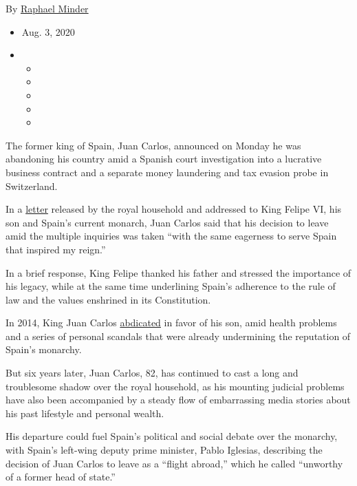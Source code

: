 By \href{https://www.nytimes3xbfgragh.onion/by/raphael-minder}{Raphael
Minder}

\begin{itemize}
\item
  Aug. 3, 2020
\item
  \begin{itemize}
  \item
  \item
  \item
  \item
  \item
  \end{itemize}
\end{itemize}

The former king of Spain, Juan Carlos, announced on Monday he was
abandoning his country amid a Spanish court investigation into a
lucrative business contract and a separate money laundering and tax
evasion probe in Switzerland.

In a
\href{https://www.casareal.es/EN/AreaPrensa/Paginas/area_prensa_comunicados_interior.aspx?data=113}{letter}
released by the royal household and addressed to King Felipe VI, his son
and Spain's current monarch, Juan Carlos said that his decision to leave
amid the multiple inquiries was taken ``with the same eagerness to serve
Spain that inspired my reign.''

In a brief response, King Felipe thanked his father and stressed the
importance of his legacy, while at the same time underlining Spain's
adherence to the rule of law and the values enshrined in its
Constitution.

In 2014, King Juan Carlos
\href{https://www.nytimes3xbfgragh.onion/2014/06/12/world/europe/spanish-lawmakers-clear-way-for-kings-abdication.html}{abdicated}
in favor of his son, amid health problems and a series of personal
scandals that were already undermining the reputation of Spain's
monarchy.

But six years later, Juan Carlos, 82, has continued to cast a long and
troublesome shadow over the royal household, as his mounting judicial
problems have also been accompanied by a steady flow of embarrassing
media stories about his past lifestyle and personal wealth.

His departure could fuel Spain's political and social debate over the
monarchy, with Spain's left-wing deputy prime minister, Pablo Iglesias,
describing the decision of Juan Carlos to leave as a ``flight abroad,''
which he called ``unworthy of a former head of state.''

